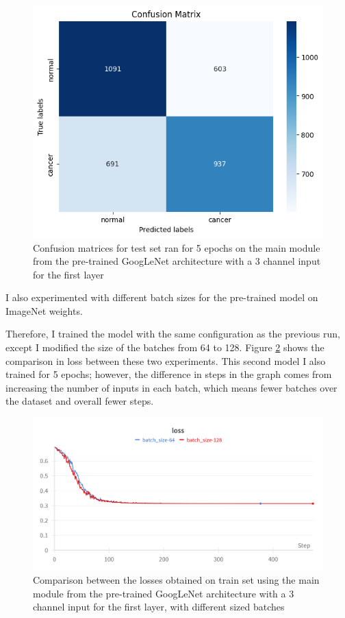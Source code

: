 \begin{figure}[!ht]
    \centering
    \includegraphics[width=0.5\linewidth]{figures/Figure21.png}
    \caption{Confusion matrices for test set ran for 5 epochs on the main module from the pre-trained GoogLeNet architecture with a 3 channel input for the first layer}
    \label{fig:fig20}
\end{figure}

I also experimented with different batch sizes for the pre-trained model on ImageNet weights.
  
Therefore, I trained the model with the same configuration as the previous run, except I modified the size of the batches from 64 to 128. Figure \ref{fig:fig21} shows the comparison in loss between these two experiments. This second model I also trained for 5 epochs; however, the difference in steps in the graph comes from increasing the number of inputs in each batch, which means fewer batches over the dataset and overall fewer steps.

\begin{figure}[H]
    \centering
    \includegraphics[width=0.75\linewidth]{figures/Figure22.png}
    \caption{Comparison between the losses obtained on train set using the main module from the pre-trained GoogLeNet architecture with a 3 channel input for the first layer, with different sized batches}
    \label{fig:fig21}
\end{figure}

